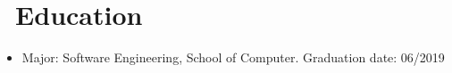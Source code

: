 \documentclass{resume}
\newcommand{\en}[1]{#1}
\newcommand{\zh}[1]{}
\begin{document}
\section{\faGraduationCap\ \en{Education}\zh{教育经历}}
\en{}
\zh{\datedsubsection{\textbf{重庆理工大学}, 本科}{2015/09 -- 2019/06}}
\begin{itemize}
      \item \en{Major: Software Engineering, School of Computer. Graduation date: 06/2019}
            \zh{软件工程，计算机学院，2019 年 6 月毕业}
\end{itemize}
\end{document}
